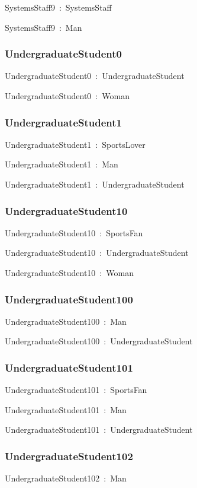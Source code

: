 \documentclass{article}
\begin{document}
SystemsStaff9~:~SystemsStaff

SystemsStaff9~:~Man

\subsubsection*{UndergraduateStudent0}

UndergraduateStudent0~:~UndergraduateStudent

UndergraduateStudent0~:~Woman

\subsubsection*{UndergraduateStudent1}

UndergraduateStudent1~:~SportsLover

UndergraduateStudent1~:~Man

UndergraduateStudent1~:~UndergraduateStudent

\subsubsection*{UndergraduateStudent10}

UndergraduateStudent10~:~SportsFan

UndergraduateStudent10~:~UndergraduateStudent

UndergraduateStudent10~:~Woman

\subsubsection*{UndergraduateStudent100}

UndergraduateStudent100~:~Man

UndergraduateStudent100~:~UndergraduateStudent

\subsubsection*{UndergraduateStudent101}

UndergraduateStudent101~:~SportsFan

UndergraduateStudent101~:~Man

UndergraduateStudent101~:~UndergraduateStudent

\subsubsection*{UndergraduateStudent102}

UndergraduateStudent102~:~Man
\end{document}
